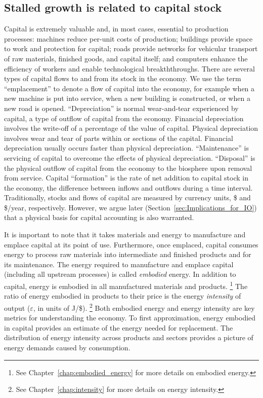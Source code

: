 \subsection{Stalled growth is related to capital stock}
\label{sec:stall_capital_stock}

Capital is extremely valuable and, in most cases, essential to production processes:
machines reduce per-unit costs of production;
buildings provide space to work and protection for capital;
roads provide networks for vehicular transport 
of raw materials, finished goods, and capital itself; and
computers enhance the efficiency of workers and enable technological breakththroughs.
There are several types of capital flows
to and from its stock in the economy.
We use the term ``emplacement'' to denote a flow of capital into
the economy, for example when a new machine is put into service,
when a new building is constructed, or
when a new road is opened.
``Depreciation'' is normal wear-and-tear experienced by capital, 
a type of outflow of capital from the economy.
Financial depreciation involves the write-off of a percentage 
of the value of capital.
Physical depreciation involves wear and tear of parts within or sections of the capital.
Financial depreciation usually occurs faster than physical depreciation.
``Maintenance'' is servicing of capital to overcome the effects of physical depreciation.
``Disposal'' is the physical outflow of capital from the economy to the biosphere
upon removal from service.
Capital ``formation'' is the rate of net
addition to capital stock in the economy,
the difference between inflows and outflows
during a time interval.
Traditionally, stocks and flows of capital are measured by currency units, 
\$ and \$/year, respectively.
However, we argue later (Section~\ref{sec:Implications_for_IO})
that a physical basis for capital accounting is also warranted.

It is important to note that it takes materials and energy
to manufacture and emplace capital at its point of use.
Furthermore, once emplaced,
capital consumes energy to process raw materials 
into intermediate and finished products
and for its maintenance.
The energy required to manufacture and emplace capital
(including all upstream processes)
is called \emph{embodied} energy.
In addition to capital, energy is embodied in all manufactured materials and
products.%
	\footnote{
	See Chapter~\ref{chap:embodied_energy} for more details
	on embodied energy.
	}
The ratio of energy embodied in products to their price 
is the energy \emph{intensity} of output ($\varepsilon$, 
in units of J/\$).%
	\footnote{
	See Chapter~\ref{chap:intensity} for more details 
	on energy intensity.
	}
Both embodied energy and energy intensity are key metrics 
for understanding the economy.
To first approximation, energy embodied in capital provides an estimate of the 
energy needed for replacement.
The distribution of energy intensity
across products and sectors
provides a picture of energy demands caused by consumption.

